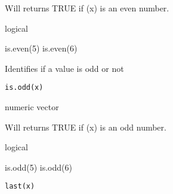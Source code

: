 \documentclass[a4paper]{book}
\begin{document}
%
\begin{Details}\relax
Will returns TRUE if (x) is an even number.
\end{Details}
%
\begin{Value}
logical
\end{Value}
%
\begin{SeeAlso}\relax
{}
\end{SeeAlso}
%
\begin{Examples}
\begin{ExampleCode}
is.even(5)
is.even(6)
\end{ExampleCode}
\end{Examples}
\newpage
{}
%
\begin{Description}\relax
Identifies if a value is odd or not
\end{Description}
%
\begin{Usage}
\begin{verbatim}
is.odd(x)
\end{verbatim}
\end{Usage}
%
\begin{Arguments}
\begin{ldescription}
\item[\code{x}] numeric vector
\end{ldescription}
\end{Arguments}
%
\begin{Details}\relax
Will returns TRUE if (x) is an odd number.
\end{Details}
%
\begin{Value}
logical
\end{Value}
%
\begin{SeeAlso}\relax
{}
\end{SeeAlso}
%
\begin{Examples}
\begin{ExampleCode}
is.odd(5)
is.odd(6)
\end{ExampleCode}
\end{Examples}
\newpage
{}
%
\begin{Usage}
\begin{verbatim}
last(x)
\end{verbatim}
\end{Usage}
%
\begin{Arguments}
\begin{ldescription}
\item[\code{x}] 


\end{ldescription}
\end{Arguments}
\end{document}
